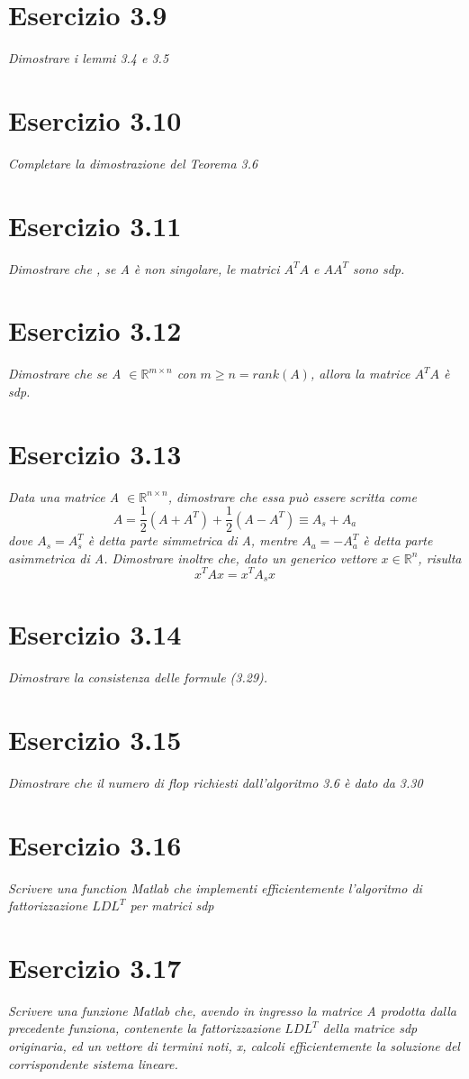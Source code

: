 \section{Esercizio 3.9}
\emph{Dimostrare i lemmi 3.4 e 3.5}
\section{Esercizio 3.10}
\emph{Completare la dimostrazione del Teorema 3.6}
\section{Esercizio 3.11}
\emph{Dimostrare che , se A è non singolare, le matrici $A^{T}A$ e $AA^{T}$ sono sdp.}
\section{Esercizio 3.12}
\emph{Dimostrare che se A $\in \mathbb{R}^{m \times n} $ con $ m \geq n = rank(A)$, allora la matrice $A^{T} A$ è sdp.}
\section{Esercizio 3.13}
\emph{Data una matrice A $\in \mathbb{R}^{n \times n} $, dimostrare che essa può essere scritta come
$$A = \frac{1}{2} (A+A^{T})+\frac{1}{2} (A-A^{T}) \equiv A_{s} + A_{a}$$
dove $ A_{s} = A_{s}^{T} $ è detta parte simmetrica di A, mentre $A_{a} = - A^{T}_{a} $ è detta parte asimmetrica di A. Dimostrare inoltre che, dato un generico vettore $ x \in \mathbb{R}^{n}$, risulta} $$ x^{T} Ax = x^{T} A_{s} x $$
 \section{Esercizio 3.14}
\emph{Dimostrare la consistenza delle formule (3.29).}
\section{Esercizio 3.15}
\emph{Dimostrare che il numero di flop richiesti dall'algoritmo 3.6 è dato da 3.30 }
\section{Esercizio 3.16}
\emph{Scrivere una function Matlab che implementi efficientemente l'algoritmo di fattorizzazione $LDL^{T}$ per matrici sdp}
\section{Esercizio 3.17}
\emph{Scrivere una funzione Matlab che, avendo in ingresso la matrice A prodotta dalla precedente funziona, contenente la fattorizzazione $LDL^{T}$ della matrice sdp originaria, ed un vettore di termini noti, x, calcoli efficientemente la soluzione del corrispondente sistema lineare.}
